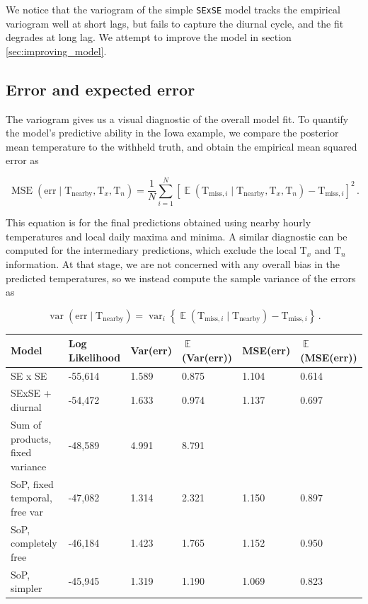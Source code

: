 \documentclass[letter]{article}
\newcommand{\genericdel}[3]{%
      \left#1#3\right#2
    }
\newcommand{\del}[1]{\genericdel(){#1}}
\newcommand{\sbr}[1]{\genericdel[]{#1}}
\newcommand{\cbr}[1]{\genericdel\{\}{#1}}
\DeclareMathOperator{\E}{\mathbb{E}}
\DeclareMathOperator{\var}{{var}}
\DeclareMathOperator{\mse}{{MSE}}
\newcommand{\T}{\mathrm{T}}
\newcommand{\Tn}{\T_{n}}
\newcommand{\Tx}{\T_{x}}
\newcommand{\miss}{\mathrm{miss}}
\newcommand{\obs}{\mathrm{nearby}}
\newcommand{\error}{\mathrm{err}}
\begin{document}
        We notice that the variogram of the simple \texttt{SExSE} model tracks the empirical variogram well at short lags, but fails to capture the diurnal cycle, and the fit degrades at long lag. We attempt to improve the model in section \ref{sec:improving_model}.
    


        \subsection{Error and expected error}\label{error-and-expected-error}

The variogram gives us a visual diagnostic of the overall model fit. To quantify the model's predictive ability in the Iowa example, we compare the posterior mean temperature to the withheld truth, and obtain the empirical mean squared error as

\begin{equation}
    \label{eq:mse}
    \mse\del{\error \mid \T_\obs,\Tx,\Tn} = \frac{1}{N} \sum_{i=1}^N \sbr{\E\del{\T_{\miss,i} \mid \T_\obs,\Tx,\Tn} - \T_{\miss,i}}^2\,.
\end{equation}

This equation is for the final predictions obtained using nearby hourly temperatures and local daily maxima and minima.
A similar diagnostic can be computed for the intermediary predictions, which exclude the local \(\Tx\) and \(\Tn\) information.
At that stage, we are not concerned with any overall bias in the predicted temperatures, so we instead compute the sample variance of the errors as

\begin{equation}
    \label{eq:varerr}
    \var\del{\error \mid \T_\obs} = \var_i \cbr{\E\del{\T_{\miss,i} \mid \T_\obs} - \T_{\miss,i}}\,.
\end{equation}

\begin{longtable}[]{@{}llllll@{}}
\toprule
Model & Log Likelihood & Var(err) & \(\E\)(Var(err)) & MSE(err) & \(\E\)(MSE(err))\tabularnewline
\midrule
\endhead
SE x SE & -55,614 & 1.589 & 0.875 & 1.104 & 0.614\tabularnewline
SExSE + diurnal & -54,472 & 1.633 & 0.974 & 1.137 & 0.697\tabularnewline
Sum of products, fixed variance & -48,589 & 4.991 & 8.791 & &\tabularnewline
SoP, fixed temporal, free var & -47,082 & 1.314 & 2.321 & 1.150 & 0.897\tabularnewline
SoP, completely free & -46,184 & 1.423 & 1.765 & 1.152 & 0.950\tabularnewline
SoP, simpler & -45,945 & 1.319 & 1.190 & 1.069 & 0.823\tabularnewline
\bottomrule
\end{longtable}
\end{document}
